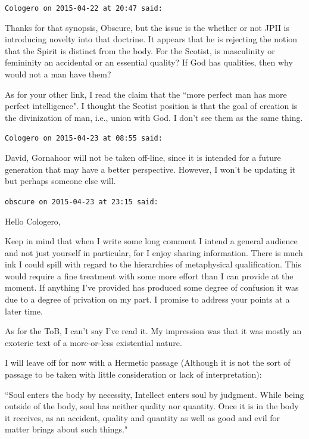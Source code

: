\begin{footnotesize}
\begin{sffamily}
\hfill

\texttt{Cologero on 2015-04-22 at 20:47 said: }

Thanks for that synopsis, Obscure, but the issue is the whether or not JPII is introducing novelty into that doctrine. It appears that he is rejecting the notion that the Spirit is distinct from the body. For the Scotist, is masculinity or femininity an accidental or an essential quality? If God has qualities, then why would not a man have them?

As for your other link, I read the claim that the ``more perfect man has more perfect intelligence". I thought the Scotist position is that the goal of creation is the divinization of man, i.e., union with God. I don't see them as the same thing.


\hfill

\texttt{Cologero on 2015-04-23 at 08:55 said: }

David, Gornahoor will not be taken off-line, since it is intended for a future generation that may have a better perspective. However, I won't be updating it but perhaps someone else will.


\hfill

\texttt{obscure on 2015-04-23 at 23:15 said: }

Hello Cologero,

Keep in mind that when I write some long comment I intend a general audience and not just yourself in particular, for I enjoy sharing information. There is much ink I could spill with regard to the hierarchies of metaphysical qualification. This would require a fine treatment with some more effort than I can provide at the moment. If anything I've provided has produced some degree of confusion it was due to a degree of privation on my part. I promise to address your points at a later time.

As for the ToB, I can't say I've read it. My impression was that it was mostly an exoteric text of a more-or-less existential nature.

I will leave off for now with a Hermetic passage (Although it is not the sort of passage to be taken with little consideration or lack of interpretation):

``Soul enters the body by necessity, Intellect enters soul by judgment. While being outside of the body, soul has neither quality nor quantity. Once it is in the body it receives, as an accident, quality and quantity as well as good and evil for matter brings about such things."



\end{sffamily}
\end{footnotesize}
